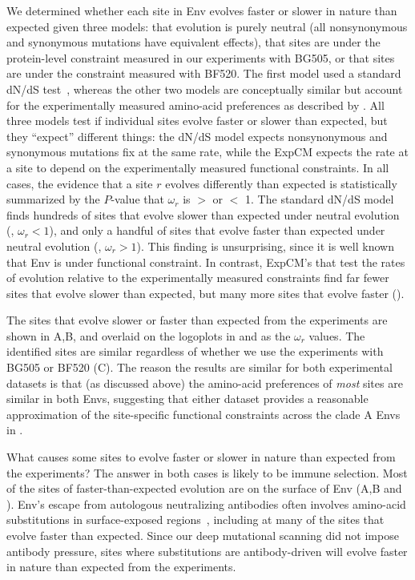 \documentclass[9pt]{elife}
\begin{document}
We determined whether each site in Env evolves faster or slower in nature than expected given three models: that evolution is purely neutral (all nonsynonymous and synonymous mutations have equivalent effects), that sites are under the protein-level constraint measured in our experiments with BG505, or that sites are under the constraint measured with BF520. 
The first model used a standard dN/dS test~\citep[the ``FEL'' method of][]{kosakovsky2005not}, whereas the other two models are conceptually similar but account for the experimentally measured amino-acid preferences as described by \citet{bloom2017identification}.
All three models test if individual sites evolve faster or slower than expected, but they ``expect'' different things: the dN/dS model expects nonsynonymous and synonymous mutations fix at the same rate, while the ExpCM expects the rate at a site to depend on the experimentally measured functional constraints.
In all cases, the evidence that a site $r$ evolves differently than expected is statistically summarized by the $P$-value that $\omega_r$ is $>$ or $<$ 1.
The standard dN/dS model finds hundreds of sites that evolve slower than expected under neutral evolution (, $\omega_r < 1$), and only a handful of sites that evolve faster than expected under neutral evolution (, $\omega_r > 1$).
This finding is unsurprising, since it is well known that Env is under functional constraint.
In contrast, ExpCM's that test the rates of evolution relative to the experimentally measured constraints find far fewer sites that evolve slower than expected, but many more sites that evolve faster (). 

The sites that evolve slower or faster than expected from the experiments are shown in A,B, and overlaid on the logoplots in  and  as the $\omega_r$ values.
The identified sites are similar regardless of whether we use the experiments with BG505 or BF520 (C).
The reason the results are similar for both experimental datasets is that (as discussed above) the amino-acid preferences of \emph{most} sites are similar in both Envs, suggesting that either dataset provides a reasonable approximation of the site-specific functional constraints across the clade A Envs in .

What causes some sites to evolve faster or slower in nature than expected from the experiments?
The answer in both cases is likely to be immune selection.
Most of the sites of faster-than-expected evolution are on the surface of Env (A,B and ).
Env's escape from autologous neutralizing antibodies often involves amino-acid substitutions in surface-exposed regions~\citep{moore2009specificity}, including at many of the sites that evolve faster than expected.
Since our deep mutational scanning did not impose antibody pressure, sites where substitutions are antibody-driven will evolve faster in nature than expected from the experiments.
\end{document}
